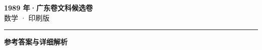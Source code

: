 \documentclass[zihao=5, a4paper]{ctexart}
\begin{document}
\begin{center}
  {\Large\bfseries 1989 年·广东卷文科候选卷}\\[4pt]
  {\large 数学 · 印刷版}
\end{center}
\medskip
{}

\par\bigskip\hrule\bigskip
{}
\begin{center}{\large\bfseries 参考答案与详细解析}\end{center}
\smallskip

\end{document}
